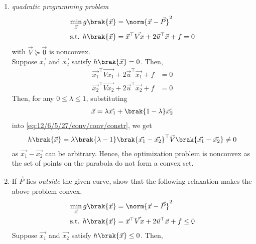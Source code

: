 \begin{enumerate}[label=\thechapter.\arabic*,ref=\thechapter.\theenumi]
    \item {\em quadratic programming problem} 
 \begin{align}
        \min_{\vec{x}} g\brak{\vec{x}} &= \norm{\vec{x}-\vec{P}}^2 \\
        \textrm{s.t. } h\brak{\vec{x}} &= \vec{x}^\top\vec{Vx} + 2\vec{u}^\top\vec{x} + f = 0 \label{eq:12/6/5/27/conv/conv/nonconv-constr/app}
    \end{align}
    with $\vec{V}\succeq \vec{0}$ 
    is nonconvex.
    \\
    \solution  Suppose $\vec{x_1}$ and $\vec{x_2}$ satisfy $h\brak{\vec{x}} = 0$. Then,
    \begin{align}
        \vec{x_1}^\top\vec{Vx_1} + 2\vec{u}^\top\vec{x_1} + f &= 0 \label{eq:12/6/5/27/conv/conv/x1-parab} \\
        \vec{x_2}^\top\vec{Vx_2} + 2\vec{u}^\top\vec{x_2} + f &= 0 \label{eq:12/6/5/27/conv/conv/x2-parab}
    \end{align}
    Then, for any $0 \le \lambda \le 1$, substituting
    \begin{align}
        \vec{x} =\lambda\vec{x_1} + \brak{1-\lambda}\vec{x_2}
    \end{align}
    into \eqref{eq:12/6/5/27/conv/conv/constr}, we get
    \begin{align}
        h\brak{\vec{x}} = \lambda\brak{\lambda-1}\brak{\vec{x_1}-\vec{x_2}}^\top\vec{V}\brak{\vec{x_1}-\vec{x_2}} \neq 0
        \label{eq:12/6/5/27/conv/conv/nonconvex}
    \end{align}
    as $\vec{x_1} - \vec{x_2}$ can be arbitrary. Hence, the optimization 
    problem is nonconvex as the set of points on the parabola do not form a 
    convex set.
    \item If $\vec{P}$ lies \textit{outside} the given curve, show that the following
    relaxation makes the above problem convex.
    \begin{align}
        \min_{\vec{x}} g\brak{\vec{x}} &= \norm{\vec{x}-\vec{P}}^2 \label{eq:12/6/5/27/conv/conv/cost} \\
        \textrm{s.t. } h\brak{\vec{x}} &= \vec{x}^\top\vec{Vx} + 2\vec{u}^\top\vec{x} + f \le 0 \label{eq:12/6/5/27/conv/conv/constr}
    \end{align}
    \solution 
 Suppose 
    $\vec{x_1}$ and $\vec{x_2}$ satisfy $h\brak{\vec{x}} \le 0$. Then, 

\end{enumerate}
